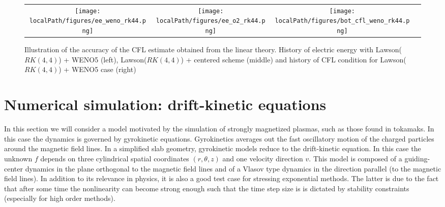 \begin{figure}
  \centering
  \begin{tabular}{cccc}
    \texttt{[image: \\localPath/figures/ee\_weno\_rk44.png]} &\hspace{-0.2cm}\texttt{[image: \\localPath/figures/ee\_o2\_rk44.png]} & \hspace{-0.2cm}\texttt{[image: \\localPath/figures/bot\_cfl\_weno\_rk44.png]} 
  \end{tabular}
  \caption{Illustration of the accuracy of the CFL estimate obtained from the linear theory. History of electric energy with Lawson($RK(4,4)$) + WENO5 (left),  Lawson($RK(4,4)$) + centered scheme (middle) and history of CFL condition for Lawson($RK(4,4)$) + WENO5 case (right)}
  \label{unstable}      
\end{figure}
 

\section{Numerical simulation: drift-kinetic equations\label{sec:dk}}

In this section we will consider a model motivated by the simulation of strongly magnetized plasmas, such as those found in tokamaks. In this case the dynamics is governed by gyrokinetic equations. Gyrokinetics averages out the fast oscillatory motion of the charged particles around the magnetic field lines. In a simplified slab geometry, gyrokinetic models reduce to the drift-kinetic equation. In this case the unknown $f$ depends on three cylindrical spatial coordinates $(r,\theta,z)$ and one velocity direction $v$. This model is composed of a guiding-center dynamics in the plane orthogonal to the magnetic field lines and of a Vlasov type dynamics in the direction parallel (to the magnetic field lines). In addition to its relevance in physics, it is also a good test case for stressing exponential methods. The latter is due to the fact that after some time the nonlinearity can become strong enough such that the time step size is is dictated by stability constraints (especially for high order methods).

